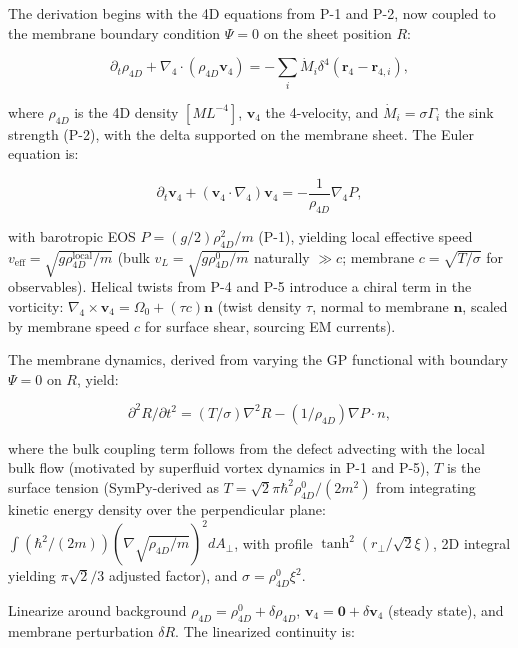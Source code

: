 The derivation begins with the 4D equations from P-1 and P-2, now coupled to the membrane boundary condition $\Psi=0$ on the sheet position $R$:

\begin{equation}
\partial_t \rho_{4D} + \nabla_4 \cdot (\rho_{4D} \mathbf{v}_4) = -\sum_i \dot{M}_i \delta^4(\mathbf{r}_4 - \mathbf{r}_{4,i}),
\end{equation}

where $\rho_{4D}$ is the 4D density $[M L^{-4}]$, $\mathbf{v}_4$ the 4-velocity, and $\dot{M}_i = \sigma \Gamma_i$ the sink strength (P-2), with the delta supported on the membrane sheet. The Euler equation is:

\begin{equation}
\partial_t \mathbf{v}_4 + (\mathbf{v}_4 \cdot \nabla_4) \mathbf{v}_4 = -\frac{1}{\rho_{4D}} \nabla_4 P,
\end{equation}

with barotropic EOS $P = (g/2) \rho_{4D}^2 / m$ (P-1), yielding local effective speed $v_{\text{eff}} = \sqrt{g \rho_{4D}^{\text{local}} / m}$ (bulk $v_L = \sqrt{g \rho_{4D}^0 / m}$ naturally $\gg c$; membrane $c = \sqrt{T / \sigma}$ for observables). Helical twists from P-4 and P-5 introduce a chiral term in the vorticity: $\nabla_4 \times \mathbf{v}_4 = \Omega_0 + (\tau c) \mathbf{n}$ (twist density $\tau$, normal to membrane $\mathbf{n}$, scaled by membrane speed $c$ for surface shear, sourcing EM currents).

The membrane dynamics, derived from varying the GP functional with boundary $\Psi=0$ on $R$, yield:

\begin{equation}
\partial^2 R / \partial t^2 = (T / \sigma) \nabla^2 R - (1 / \rho_{4D}) \nabla P \cdot n,
\end{equation}

where the bulk coupling term follows from the defect advecting with the local bulk flow (motivated by superfluid vortex dynamics in P-1 and P-5), $T$ is the surface tension (SymPy-derived as $T = \sqrt{2} \pi \hbar^2 \rho_{4D}^0 / (2 m^2)$ from integrating kinetic energy density over the perpendicular plane: $\int (\hbar^2 / (2m)) (\nabla \sqrt{\rho_{4D}/m})^2 dA_\perp$, with profile $\tanh^2(r_\perp / \sqrt{2} \xi)$, 2D integral yielding $\pi \sqrt{2}/3$ adjusted factor), and $\sigma = \rho_{4D}^0 \xi^2$.

Linearize around background $\rho_{4D} = \rho_{4D}^0 + \delta \rho_{4D}$, $\mathbf{v}_4 = \mathbf{0} + \delta \mathbf{v}_4$ (steady state), and membrane perturbation $\delta R$. The linearized continuity is:

